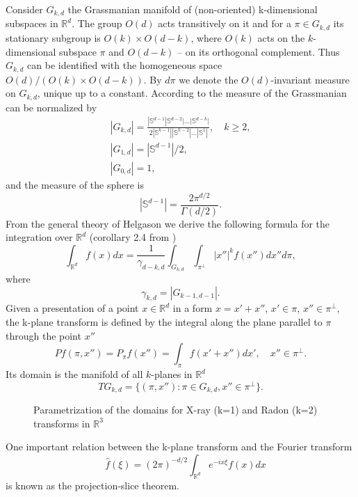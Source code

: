 \documentclass[12pt]{iopart}
\begin{document}
Consider $G_{k,d}$ the Grassmanian manifold of (non-oriented) k-dimensional subspaces in $\mathbb R^d$. The group $O(d)$ acts transitively on it and for a $\pi\in G_{k,d}$ its stationary subgroup is $O(k)\times O(d-k)$, where $O(k)$ acts on the $k$-dimensional subspace $\pi$ and $O(d-k)$ -- on its orthogonal complement. Thus $G_{k,d}$ can be identified with the homogeneous space $O(d)/(O(k)\times O(d-k))$. By $d\pi$ we denote the $O(d)$-invariant measure on $G_{k,d}$, unique up to a constant.  According to \cite{Sa} the measure of the Grassmanian can be normalized by
\begin{eqnarray*}
|G_{k,d}|=\frac{|\mathbb S^{d-1}|\mathbb S^{d-2}|\dots|\mathbb S^{d-k}|}{2|\mathbb S^{k-1}||\mathbb S^{k-2}|\dots|\mathbb S^1|},\quad k\ge2,\\
|G_{1,d}|=|\mathbb S^{d-1}|/2,\\
|G_{0,d}|=1,
\end{eqnarray*}
and the measure of the sphere is
    $$
    |\mathbb S^{d-1}|=\frac{2\pi^{d/2}}{\Gamma(d/2)}.
    $$
From the general theory of Helgason \cite{H} we derive the following formula for the integration over $\mathbb R^d$ (corollary 2.4 from \cite{K})
\begin{equation}
\label{integral}
\int_{\mathbb R^d}f(x)dx=\frac{1}{\gamma_{d-k,d}}\int_{G_{k,d}}\int_{\pi^\perp}|x''|^kf(x'')dx''d\pi,
\end{equation}
where
$$
\gamma_{k,d}=|G_{k-1,d-1}|.
$$
Given a presentation of a point $x\in\mathbb R^d$ in a form $x=x'+x''$, $x'\in\pi$, $x''\in\pi^\perp$, the k-plane transform is defined by the integral along the plane parallel to $\pi$ through the point $x''$
	$$Pf(\pi,x'')=P_\pi f(x'')=\int_{\pi}f(x'+x'')dx',\quad x''\in\pi^\perp.$$
Its domain is the manifold of all $k$-planes in $\mathbb R^d$ 
$$TG_{k,d}=\{(\pi,x''):\pi\in G_{k,d}, x''\in\pi^\perp\}.$$

\begin{figure}[h]
\caption{Parametrization of the domains for X-ray (k=1) and Radon (k=2) transforms in $\mathbb R^3$}
\label{some example}
\end{figure}
One important relation between the k-plane transform and the Fourier transform
$$\quad \widehat f(\xi)=(2\pi)^{-d/2}\int_{\mathbb R^d}e^{-ix\xi}f(x)dx$$
is  known as the projection-slice theorem. 
\end{document}
